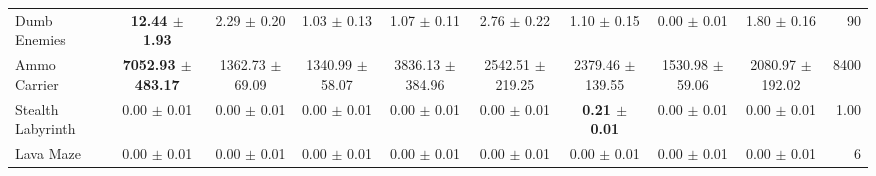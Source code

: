 \begin{table}[t]
{\begin{tabular}{lccccccccr}
    Dumb Enemies & \textbf{12.44 $\pm$ 1.93} & 2.29 $\pm$ 0.20 & 1.03 $\pm$ 0.13 & 1.07 $\pm$ 0.11 & 2.76 $\pm$ 0.22 & 1.10 $\pm$ 0.15 & 0.00 $\pm$ 0.01 & 1.80 $\pm$ 0.16 & 90 \\
    Ammo Carrier & \textbf{7052.93 $\pm$ 483.17} & 1362.73 $\pm$ 69.09 & 1340.99 $\pm$ 58.07 & 3836.13 $\pm$ 384.96 & 2542.51 $\pm$ 219.25 & 2379.46 $\pm$ 139.55 & 1530.98 $\pm$ 59.06 & 2080.97 $\pm$ 192.02 & 8400 \\
    Stealth Labyrinth & 0.00 $\pm$ 0.01 & 0.00 $\pm$ 0.01 & 0.00 $\pm$ 0.01 & 0.00 $\pm$ 0.01 & 0.00 $\pm$ 0.01 & \textbf{0.21 $\pm$ 0.01} & 0.00 $\pm$ 0.01 & 0.00 $\pm$ 0.01 & 1.00 \\
    Lava Maze & 0.00 $\pm$ 0.01 & 0.00 $\pm$ 0.01 & 0.00 $\pm$ 0.01 & 0.00 $\pm$ 0.01 & 0.00 $\pm$ 0.01 & 0.00 $\pm$ 0.01 & 0.00 $\pm$ 0.01 & 0.00 $\pm$ 0.01 & 6 \\
    \bottomrule
  \end{tabular}%
  }
\end{table}

